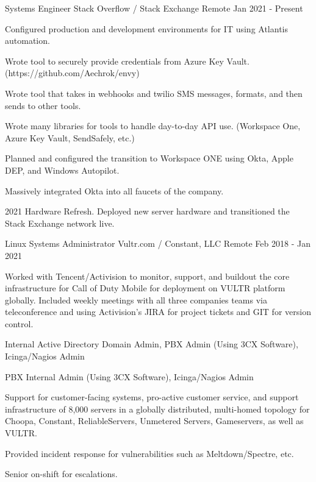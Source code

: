 
\begin{cventries}

	\cventry
	{Systems Engineer}
	{Stack Overflow / Stack Exchange}
	{Remote}
	{Jan 2021 - Present}
	{
		\begin{cvitems}
		\item {Configured production and development environments for IT using Atlantis automation.}
		\item {Wrote tool to securely provide credentials from Azure Key Vault. (https://github.com/Aechrok/envy)}
		\item {Wrote tool that takes in webhooks and twilio SMS messages, formats, and then sends to other tools.}
		\item {Wrote many libraries for tools to handle day-to-day API use. (Workspace One, Azure Key Vault, SendSafely, etc.)}
		\item {Planned and configured the transition to Workspace ONE using Okta, Apple DEP, and Windows Autopilot.}
		\item {Massively integrated Okta into all faucets of the company.}
		\item {2021 Hardware Refresh. Deployed new server hardware and transitioned the Stack Exchange network live.}
		\end{cvitems}
	}


	\cventry
	{Linux Systems Administrator}
	{Vultr.com / Constant, LLC}
	{Remote}
	{Feb 2018 - Jan 2021}
	{
		\begin{cvitems}
		\item {Worked with Tencent/Activision to monitor, support, and buildout the core infrastructure for Call of Duty Mobile for deployment on VULTR platform globally. Included weekly meetings with all three companies teams via teleconference and using Activision's JIRA for project tickets and GIT for version control.}
		\item {Internal Active Directory Domain Admin, PBX Admin (Using 3CX Software), Icinga/Nagios Admin }
		\item {PBX Internal Admin (Using 3CX Software), Icinga/Nagios Admin }
		\item {Support for customer-facing systems, pro-active customer service, and support infrastructure of 8,000 servers in a globally distributed, multi-homed topology for Choopa, Constant, ReliableServers, Unmetered Servers, Gameservers, as well as VULTR.}
		\item {Provided incident response for vulnerabilities such as Meltdown/Spectre, etc.}
		\item {Senior on-shift for escalations.}
		\end{cvitems}
	}


\end{cventries}
